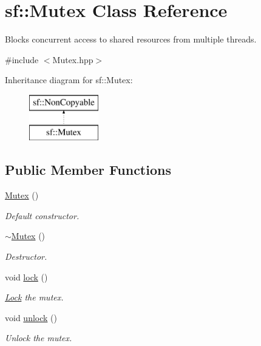 \hypertarget{classsf_1_1_mutex}{}\section{sf\+:\+:Mutex Class Reference}
\label{classsf_1_1_mutex}


Blocks concurrent access to shared resources from multiple threads.  




{\ttfamily \#include $<$Mutex.\+hpp$>$}

Inheritance diagram for sf\+:\+:Mutex\+:\begin{figure}[H]
\begin{center}
\leavevmode
\includegraphics[height=2.000000cm]{classsf_1_1_mutex}
\end{center}
\end{figure}
\subsection*{Public Member Functions}
\begin{DoxyCompactItemize}
\item 
\mbox{\label{classsf_1_1_mutex_a9bd52a48320fd7b6db8a78037aad276e}} 
\hyperlink{classsf_1_1_mutex_a9bd52a48320fd7b6db8a78037aad276e}{Mutex} ()
\begin{DoxyCompactList}\small\item\em Default constructor. \end{DoxyCompactList}\item 
\mbox{\label{classsf_1_1_mutex_a9f76a67b7b6d3918131a692179b4e3f2}} 
\hyperlink{classsf_1_1_mutex_a9f76a67b7b6d3918131a692179b4e3f2}{$\sim$\+Mutex} ()
\begin{DoxyCompactList}\small\item\em Destructor. \end{DoxyCompactList}\item 
void \hyperlink{classsf_1_1_mutex_a1a16956a6bbea764480c1b80f2e45763}{lock} ()
\begin{DoxyCompactList}\small\item\em \hyperlink{classsf_1_1_lock}{Lock} the mutex. \end{DoxyCompactList}\item 
void \hyperlink{classsf_1_1_mutex_ade71268ffc5e80756652058b01c23c33}{unlock} ()
\begin{DoxyCompactList}\small\item\em Unlock the mutex. \end{DoxyCompactList}\end{DoxyCompactItemize}


